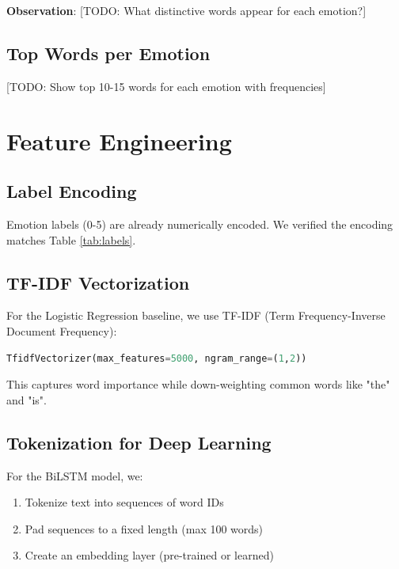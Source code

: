 \documentclass[12pt,a4paper]{article}
\begin{document}
\textbf{Observation}: [TODO: What distinctive words appear for each emotion?]

\subsection{Top Words per Emotion}
[TODO: Show top 10-15 words for each emotion with frequencies]

\section{Feature Engineering}

\subsection{Label Encoding}
Emotion labels (0-5) are already numerically encoded. We verified the encoding matches Table \ref{tab:labels}.

\subsection{TF-IDF Vectorization}
For the Logistic Regression baseline, we use TF-IDF (Term Frequency-Inverse Document Frequency):

\begin{lstlisting}[language=Python, caption={TF-IDF parameters}]
TfidfVectorizer(max_features=5000, ngram_range=(1,2))
\end{lstlisting}

This captures word importance while down-weighting common words like "the" and "is".

\subsection{Tokenization for Deep Learning}
For the BiLSTM model, we:
\begin{enumerate}
    \item Tokenize text into sequences of word IDs
    \item Pad sequences to a fixed length (max 100 words)
    \item Create an embedding layer (pre-trained or learned)
\end{enumerate}
\end{document}
